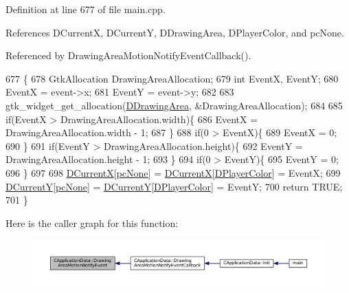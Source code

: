 Definition at line 677 of file main.\+cpp.



References D\+CurrentX, D\+CurrentY, D\+Drawing\+Area, D\+Player\+Color, and pc\+None.



Referenced by Drawing\+Area\+Motion\+Notify\+Event\+Callback().


\begin{DoxyCode}
677                                                                                                \{
678     GtkAllocation DrawingAreaAllocation;
679     \textcolor{keywordtype}{int} EventX, EventY;
680     EventX = \textcolor{keyword}{event}->x;
681     EventY = \textcolor{keyword}{event}->y;
682 
683     gtk\_widget\_get\_allocation(\hyperlink{classCApplicationData_a4735f5d31632313e0b2a1659eb178987}{DDrawingArea}, &DrawingAreaAllocation);
684     
685     \textcolor{keywordflow}{if}(EventX > DrawingAreaAllocation.width)\{
686         EventX = DrawingAreaAllocation.width - 1;
687     \}
688     \textcolor{keywordflow}{if}(0 > EventX)\{
689         EventX = 0;   
690     \}
691     \textcolor{keywordflow}{if}(EventY > DrawingAreaAllocation.height)\{
692         EventY = DrawingAreaAllocation.height - 1;
693     \}
694     \textcolor{keywordflow}{if}(0 > EventY)\{
695         EventY = 0;   
696     \}
697 
698     \hyperlink{classCApplicationData_a1dc7ee482a39f7978c71365ac540f97a}{DCurrentX}[\hyperlink{GameDataTypes_8h_aafb0ca75933357ff28a6d7efbdd7602fa88767aa8e02c7b3192bbab4127b3d729}{pcNone}] = \hyperlink{classCApplicationData_a1dc7ee482a39f7978c71365ac540f97a}{DCurrentX}[\hyperlink{classCApplicationData_a53550939b20cba70570f113e4d1c5d02}{DPlayerColor}] = EventX;
699     \hyperlink{classCApplicationData_a0ba39779ae11c8072258c6ddfebd6052}{DCurrentY}[\hyperlink{GameDataTypes_8h_aafb0ca75933357ff28a6d7efbdd7602fa88767aa8e02c7b3192bbab4127b3d729}{pcNone}] = \hyperlink{classCApplicationData_a0ba39779ae11c8072258c6ddfebd6052}{DCurrentY}[\hyperlink{classCApplicationData_a53550939b20cba70570f113e4d1c5d02}{DPlayerColor}] = EventY;
700     \textcolor{keywordflow}{return} TRUE;
701 \}
\end{DoxyCode}
Here is the caller graph for this function\+:\nopagebreak
\begin{figure}[H]
\begin{center}
\leavevmode
\includegraphics[width=350pt]{classCApplicationData_a9b53201c01b399df18b02d1e93213e45_icgraph}
\end{center}
\end{figure}
\hypertarget{classCApplicationData_a463a4bc8eabe67f9f22c46d96f5eff88}{}\label{classCApplicationData_a463a4bc8eabe67f9f22c46d96f5eff88} 
